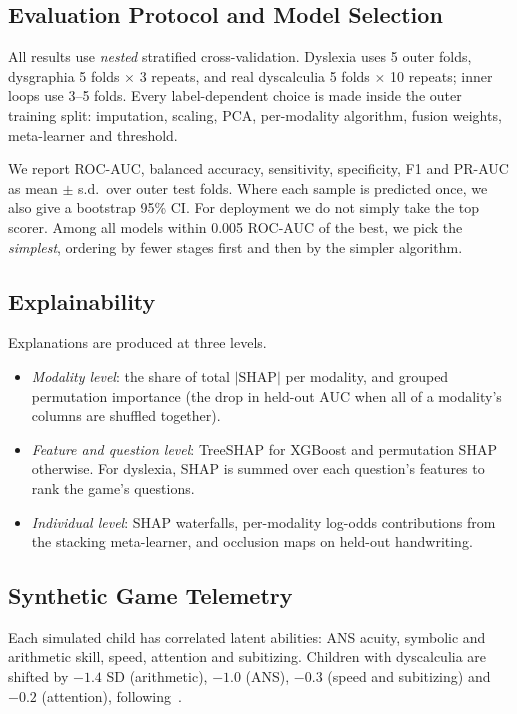 \documentclass[conference]{IEEEtran}
\begin{document}
\subsection{Evaluation Protocol and Model Selection}
All results use \emph{nested} stratified cross-validation. Dyslexia uses 5 outer folds, dysgraphia 5 folds
$\times$ 3 repeats, and real dyscalculia 5 folds $\times$ 10 repeats; inner loops use 3--5 folds. Every
label-dependent choice is made inside the outer training split: imputation, scaling, PCA, per-modality algorithm,
fusion weights, meta-learner and threshold.

We report ROC-AUC, balanced accuracy, sensitivity, specificity, F1 and PR-AUC as mean $\pm$ s.d.\ over outer test
folds. Where each sample is predicted once, we also give a bootstrap 95\% CI. For deployment we do not simply take
the top scorer. Among all models within 0.005 ROC-AUC of the best, we pick the \emph{simplest}, ordering by fewer
stages first and then by the simpler algorithm.

\subsection{Explainability}
Explanations are produced at three levels.
\begin{itemize}
  \item \emph{Modality level}: the share of total $|\mathrm{SHAP}|$ per modality, and grouped permutation importance
        (the drop in held-out AUC when all of a modality's columns are shuffled together).
  \item \emph{Feature and question level}: TreeSHAP for XGBoost and permutation SHAP otherwise. For dyslexia, SHAP is
        summed over each question's features to rank the game's questions.
  \item \emph{Individual level}: SHAP waterfalls, per-modality log-odds contributions from the stacking meta-learner,
        and occlusion maps on held-out handwriting.
\end{itemize}

\subsection{Synthetic Game Telemetry}\label{sec:synthetic}
Each simulated child has correlated latent abilities: ANS acuity, symbolic and arithmetic skill, speed, attention
and subitizing. Children with dyscalculia are shifted by $-1.4$ SD (arithmetic), $-1.0$ (ANS), $-0.3$ (speed and
subitizing) and $-0.2$ (attention), following~\cite{piazza2010acuity,decarli2020subitizing}.
\end{document}
